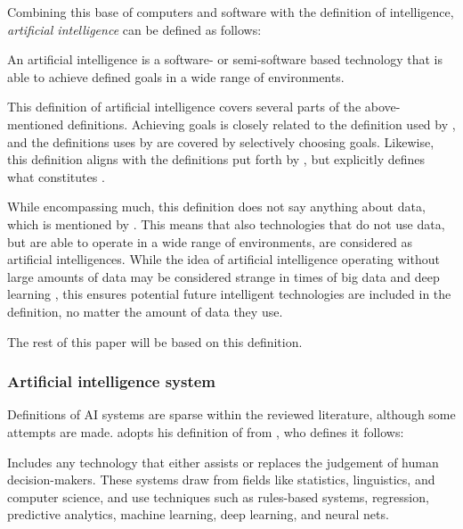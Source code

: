 Combining this base of computers and software with the definition of intelligence, \textit{artificial intelligence} can be defined as follows:
\begin{displayquote}
    An artificial intelligence is a software- or semi-software based technology that is able to achieve defined goals in a wide range of environments.
\end{displayquote}

This definition of artificial intelligence covers several parts of the above-mentioned definitions. Achieving goals is closely related to the definition used by \textcite{Mikalef_2022}, and the definitions uses by \textcite{Brand_2022,Havrda_2020} are covered by selectively choosing goals. Likewise, this definition aligns with the definitions put forth by \textcite{Liu_2021,vanBruxvoort_2021}, but explicitly defines what constitutes .

While encompassing much, this definition does not say anything about data, which is mentioned by \textcite{Mikalef_2022,Dignum_2021}. This means that also technologies that do not use data, but are able to operate in a wide range of environments, are considered as artificial intelligences. While the idea of artificial intelligence operating without large amounts of data may be considered strange in times of big data \parencite{Singh_2022} and deep learning \parencite{Lecun_2015}, this ensures potential future intelligent technologies are included in the definition, no matter the amount of data they use.

The rest of this paper will be based on this definition.


\subsubsection{Artificial intelligence system}
Definitions of AI systems are sparse within the reviewed literature, although some attempts are made. \textcite{Brand_2022} adopts his definition of  from \textcite{canada_AIsystem}, who defines it follows:
\begin{displayquote}
    Includes any technology that either assists or replaces the judgement of human decision-makers. These systems draw from fields like statistics, linguistics, and computer science, and use techniques such as rules-based systems, regression, predictive analytics, machine learning, deep learning, and neural nets. \parencite{canada_AIsystem}
\end{displayquote}

